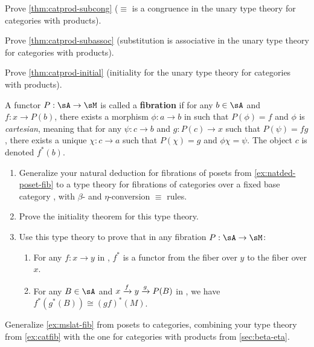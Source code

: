 \documentclass{book}
\begin{document}
\begin{ex}\label{ex:catprod-subcong}
  Prove \cref{thm:catprod-subcong} ($\equiv$ is a congruence in the unary type theory for categories with products).
\end{ex}

\begin{ex}\label{ex:catprod-subassoc}
  Prove \cref{thm:catprod-subassoc} (substitution is associative in the unary type theory for categories with products).
\end{ex}

\begin{ex}\label{ex:catprod-initial}
  Prove \cref{thm:catprod-initial} (initiality for the unary type theory for categories with products).
\end{ex}

\begin{ex}\label{ex:catfib}
  A functor $P:\sA\to \sM$ is called a \textbf{fibration} if for any $b\in \sA$ and $f:x\to P(b)$, there exists a morphism $\phi:a\to b$ in \sA such that $P(\phi)=f$ and $\phi$ is \emph{cartesian}, meaning that for any $\psi:c\to b$ and $g:P(c)\to x$ such that $P(\psi)=fg$, there exists a unique $\chi:c\to a$ such that $P(\chi)=g$ and $\phi\chi=\psi$.
  The object $c$ is denoted $f^*(b)$.
  \begin{enumerate}
  \item Generalize your natural deduction for fibrations of posets from \cref{ex:natded-poset-fib} to a type theory for fibrations of categories over a fixed base category \sM, with $\beta$- and $\eta$-conversion $\equiv$ rules.
  \item Prove the initiality theorem for this type theory.
  \item Use this type theory to prove that in any fibration $P:\sA\to\sM$:
    \begin{enumerate}
    \item For any $f:x\to y$ in \sM, $f^*$ is a functor from the fiber over $y$ to the fiber over $x$.
    \item For any $B\in \sA$ and $x\xrightarrow{f} y \xrightarrow{g} P(B)$ in \sM, we have $f^*(g^*(B)) \cong (gf)^*(M)$.
    \end{enumerate}
  \end{enumerate}
\end{ex}

\begin{ex}\label{ex:catprod-fib}
  Generalize \cref{ex:mslat-fib} from posets to categories, combining your type theory from \cref{ex:catfib} with the one for categories with products from \cref{sec:beta-eta}.
\end{ex}
\end{document}
